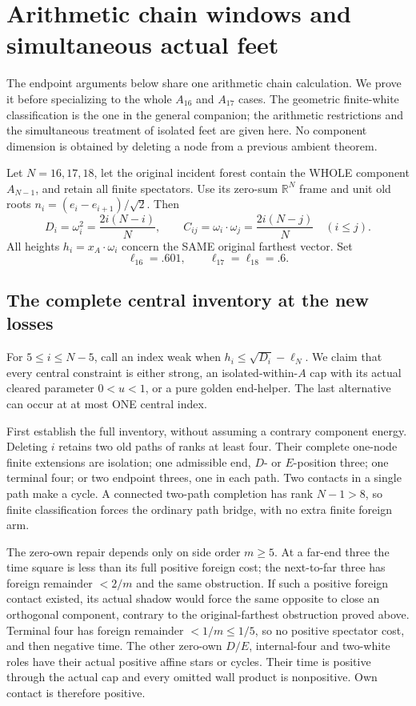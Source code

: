 \documentclass[11pt]{article}
\begin{document}
\section{Arithmetic chain windows and simultaneous actual feet}
\label{app:arithmeticchain}

The endpoint arguments below share one arithmetic chain calculation.
We prove it before specializing to the whole \(A_{16}\) and
\(A_{17}\) cases.  The geometric finite-white classification is the
one in the general companion; the arithmetic restrictions and the
simultaneous treatment of isolated feet are given here.
No component dimension is obtained by deleting a node from a
previous ambient theorem.

Let \(N=16,17,18\), let the original incident forest contain the
WHOLE component \(A_{N-1}\), and retain all finite spectators.
Use its zero-sum \(\mathbb R^N\) frame and unit old roots
\(n_i=(e_i-e_{i+1})/\sqrt2\).  Then
\[
 D_i=\omega_i^2={\frac{2i(N-i)}{N}},\qquad
 C_{ij}=\omega_i\cdot\omega_j={\frac{2i(N-j)}{N}}\quad(i\le j).
\]
All heights \(h_i=x_A\cdot\omega_i\) concern the SAME original
farthest vector.  Set
\[
             \ell_{16}=.601,\qquad\ell_{17}=\ell_{18}=.6.
\]

\subsection{The complete central inventory at the new losses}
\label{app:arithchaininventory}

For \(5\le i\le N-5\), call an index weak when
\(h_i\le\sqrt{D_i}-\ell_N\).
We claim that every central constraint is either strong, an
isolated-within-\(A\) cap with its actual cleared parameter
\(0<u<1\), or a pure golden end-helper.
The last alternative can occur at at most ONE central index.

First establish the full inventory, without assuming a contrary
component energy.  Deleting \(i\) retains two old paths of ranks
at least four.  Their complete one-node finite extensions are
isolation; one admissible end, \(D\)- or \(E\)-position three;
one terminal four; or two endpoint threes, one in each path.
Two contacts in a single path make a cycle.
A connected two-path completion has rank \(N-1>8\), so finite
classification forces the ordinary path bridge, with no extra
finite foreign arm.

The zero-own repair depends only on side order \(m\ge5\).
At a far-end three the time square is less than its full positive
foreign cost; the next-to-far three has foreign remainder \(<2/m\)
and the same obstruction.
If such a positive foreign contact existed, its actual shadow
would force the same opposite to close an orthogonal component,
contrary to the original-farthest obstruction proved above.
Terminal four has foreign remainder \(<1/m\le1/5\), so no positive
spectator cost, and then negative time.
The other zero-own \(D/E\), internal-four and two-white roles
have their actual positive affine stars or cycles.
Their time is positive through the actual cap and every omitted
wall product is nonpositive.  Own contact is therefore positive.
\end{document}
